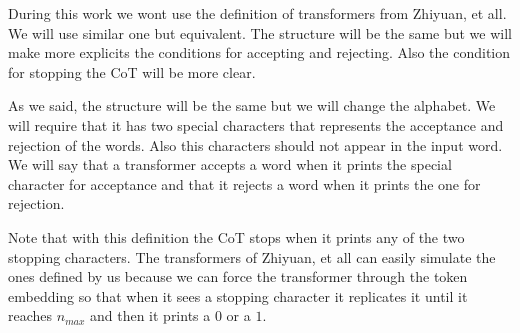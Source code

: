 During this work we wont use the definition of transformers from Zhiyuan, et all. We will use similar one but equivalent.
The structure will be the same but we will make more explicits the conditions for accepting and rejecting. Also the condition for stopping the CoT will be more clear.

As we said, the structure will be the same but we will change the alphabet. We will require that it has two special characters that represents the acceptance and rejection of the words. Also this characters should not appear in the input word.  We will say that a transformer accepts a word when it prints the special character for acceptance and that it rejects a word when it prints the one for rejection. 

Note that with this definition the CoT stops when it prints any of the two stopping characters. The transformers of Zhiyuan, et all can easily simulate the ones defined by us because we can force the transformer through the token embedding so that when it sees a stopping character it replicates it until it reaches $n_{max}$ and then it prints a $0$ or a $1$. 





